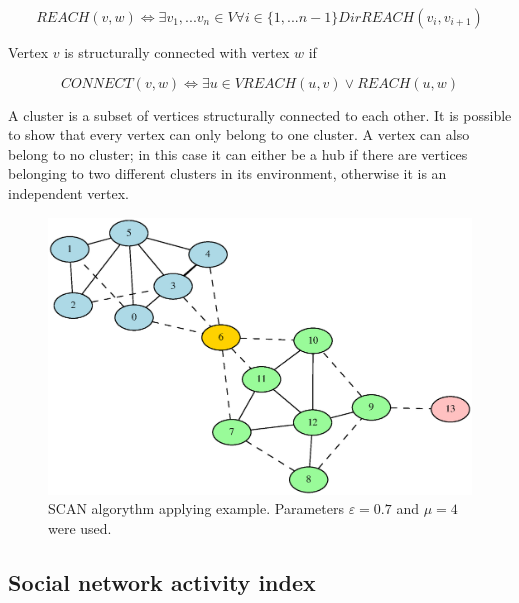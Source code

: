 \documentclass[a4paper,12pt]{article}
\begin{document}

$$
REACH(v,w) \Leftrightarrow \exists v_1,...v_n \in V \forall i \in \{1,...n-1\}DirREACH(v_i,v_{i+1})
$$

Vertex $v$ is structurally connected with vertex $w$ if


$$
CONNECT(v,w) \Leftrightarrow \exists u \in V REACH(u,v) \vee REACH(u,w)
$$

A cluster is a subset of vertices structurally connected to each other. It is possible to show that every vertex can only belong to one cluster. A vertex can also belong to no cluster; in this case it can either be a hub if there are vertices belonging to two different clusters in its environment, otherwise it is an independent vertex.


\begin{figure}[h]
      \includegraphics[width=1\linewidth]{pictures/clustering_example.eps}
      \caption{SCAN algorythm applying example. Parameters $\varepsilon=0.7$ and $\mu=4$ were used.}
      \label{fig:sigmoida}
\end{figure}


\subsection{Social network activity index}
\end{document}
